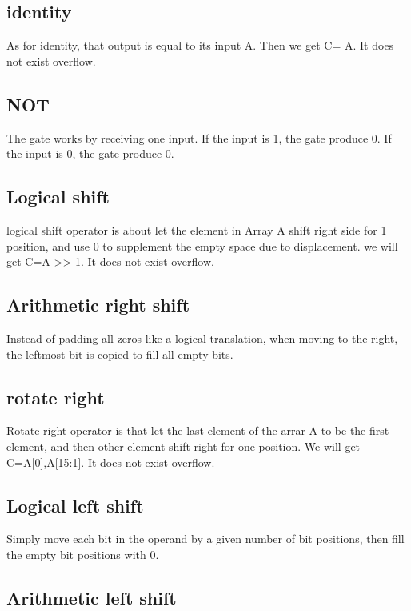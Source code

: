 \documentclass[12pt,a4paper]{article}
\begin{document}
\subsection{identity}
As for identity, that output is equal to its input A.
Then we get C= A.
It does not exist overflow.

\subsection{NOT}

The gate works by receiving one input. If the input is 1, the gate produce 0. If the input is 0, the gate produce 0.

\subsection{Logical shift}

logical shift operator is about let the element in Array A shift right side for 1 position, and use 0 to supplement the empty space due to displacement.
we will get C=A >> 1.
It does not exist overflow.

\subsection{Arithmetic right shift}

Instead of padding all zeros like a logical translation, when moving to the right, the leftmost bit is copied to fill all empty bits.

\subsection{rotate right}

Rotate right operator is that let the last element of the arrar A to be the first element, and then other element shift right for one position.
We will get C={A[0],A[15:1]}.
It does not exist overflow.

\subsection{Logical left shift}

Simply move each bit in the operand by a given number of bit positions, then fill the empty bit positions with 0.

\subsection{Arithmetic left shift}
\end{document}
